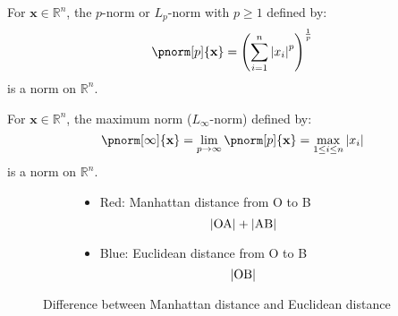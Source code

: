 \documentclass{huhtakm-template-book-v2}
\begin{document}
    \begin{eg}
        For $\mathbf{x} \in \mathbb{R}^{n}$, the $p$-norm or $L_{p}$-norm with $p \geq 1$ defined by:
        \begin{equation*}
            \pnorm[p]{\mathbf{x}} = \left(\sum_{i=1}^{n}\abs{x_{i}}^{p}\right)^{\frac{1}{p}}
        \end{equation*}
        is a norm on $\mathbb{R}^{n}$.
    \end{eg}
    \begin{eg}
        For $\mathbf{x} \in \mathbb{R}^{n}$, the maximum norm ($L_{\infty}$-norm) defined by:
        \begin{equation*}
            \pnorm[\infty]{\mathbf{x}} = \lim_{p \to \infty}\pnorm[p]{\mathbf{x}} = \max_{1 \leq i \leq n}\abs{x_{i}}
        \end{equation*}
        is a norm on $\mathbb{R}^{n}$.
    \end{eg}
    \begin{figure}[h]
        \centering
        \begin{subfigure}[h]{0.3\textwidth}
            \centering
        \end{subfigure}
        \begin{subfigure}[h]{0.4\textwidth}
            \centering
            \begin{itemize}
                \color{red}
                \item[] Red: Manhattan distance from O to B
                \begin{equation*}
                    \left|{\text{OA}}\right| + \left|{\text{AB}}\right|
                \end{equation*}
                \color{blue}
                \item[] Blue: Euclidean distance from O to B
                \begin{equation*}
                    \left|{\text{OB}}\right|
                \end{equation*}
            \end{itemize}
        \end{subfigure}
        \caption{Difference between Manhattan distance and Euclidean distance}
    \end{figure}
\end{document}
